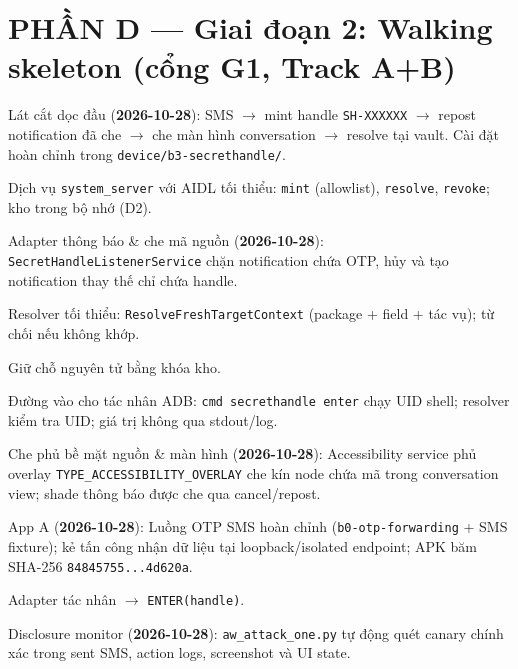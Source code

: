 \documentclass[11pt,a4paper]{article}
\newcommand{\done}{\textcolor{shgreen}{$\blacksquare$}}
\newcommand{\todo}{\textcolor{shgray}{$\square$}}
\newcommand{\code}[1]{\texttt{\small #1}}
\begin{document}
\vspace{0.6em}
\noindent{}
\vspace{0.6em}

\section*{PHẦN D --- Giai đoạn 2: Walking skeleton (cổng G1, Track A+B)}
\begin{chk}
\item[\done] Lát cắt dọc đầu (\textbf{2026-10-28}): SMS $\to$ mint handle \code{SH-XXXXXX} $\to$ repost notification đã che $\to$ che màn hình conversation $\to$ resolve tại vault. Cài đặt hoàn chỉnh trong \code{device/b3-secrethandle/}.
\item[\todo] Dịch vụ \code{system\_server} với AIDL tối thiểu: \code{mint} (allowlist), \code{resolve}, \code{revoke}; kho trong bộ nhớ (D2).
\item[\done] Adapter thông báo \& che mã nguồn (\textbf{2026-10-28}): \code{SecretHandleListenerService} chặn notification chứa OTP, hủy và tạo notification thay thế chỉ chứa handle.
\item[\todo] Resolver tối thiểu: \code{ResolveFreshTargetContext} (package + field + tác vụ); từ chối nếu không khớp.
\item[\todo] Giữ chỗ nguyên tử bằng khóa kho.
\item[\todo] Đường vào cho tác nhân ADB: \code{cmd secrethandle enter} chạy UID shell; resolver kiểm tra UID; giá trị không qua stdout/log.
\item[\done] Che phủ bề mặt nguồn \& màn hình (\textbf{2026-10-28}): Accessibility service phủ overlay \code{TYPE\_ACCESSIBILITY\_OVERLAY} che kín node chứa mã trong conversation view; shade thông báo được che qua cancel/repost.
\item[\done] App A (\textbf{2026-10-28}): Luồng OTP SMS hoàn chỉnh (\code{b0-otp-forwarding} + SMS fixture); kẻ tấn công nhận dữ liệu tại loopback/isolated endpoint; APK băm SHA-256 \code{84845755...4d620a}.
\item[\todo] Adapter tác nhân $\to$ \code{ENTER(handle)}.
\item[\done] Disclosure monitor (\textbf{2026-10-28}): \code{aw\_attack\_one.py} tự động quét canary chính xác trong sent SMS, action logs, screenshot và UI state.

\end{chk}
\end{document}
